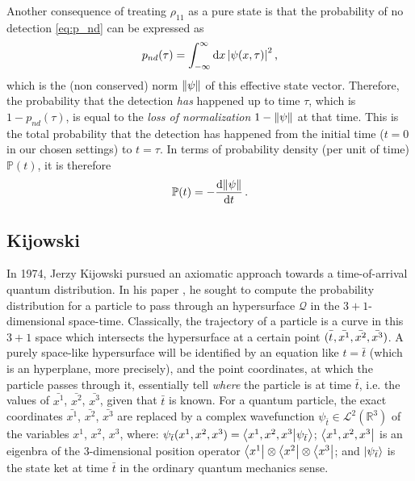 Another consequence of treating $\rho_{11}$ as a pure state is that the probability of no detection
\eqref{eq:p_nd} can be expressed as
\begin{equation}
  p_{nd}(\tau) = \int_{-\infty}^{\infty} \dd{x} \qty|\psi(x, \tau)|^2 \, \text{,}
\end{equation}
which is the (non conserved) norm $\norm{\psi}$ of this effective state vector.
Therefore, the probability that the detection \emph{has} happened
up to time $\tau$, which is $1 - p_{nd}(\tau)$, is equal to the
\emph{loss of normalization} $1 - \norm{\psi}$ at that time.
This is the total probability that the detection has happened from the initial time
($t=0$ in our chosen settings)
to $t = \tau$. In terms of probability density (per unit of time)
$\mathbb{P}(t)$, it is therefore
\begin{equation}
  \mathbb{P}(t) = - \dv{\norm{\psi}}{t} \,\text{.}
\end{equation}

\subsection{Kijowski}\label{sec:kijowski}

In 1974, Jerzy Kijowski pursued an axiomatic approach towards a
time-of-arrival quantum distribution. In his paper \parencite{Kijowski}, he sought to compute
the probability distribution for a particle to pass through an hypersurface
$\mathcal{Q}$ in the $3+1$-dimensional space-time.
Classically, the trajectory of a particle is a curve in this $3+1$ space
which intersects the hypersurface at a certain point $(\bar{t^{\vphantom{1em}}}, \bar{x^1}, \bar{x^2}, \bar{x^3})$.
A purely
space-like hypersurface will be identified by an equation like
$t=\bar{t}$ (which is an hyperplane, more precisely), and the point coordinates,
at which the particle passes through it, essentially tell \emph{where}
the particle is at time $\bar{t}$, i.e. the values of $\bar{x^1}$, $\bar{x^2}$, $\bar{x^3}$,
given that $\bar{t}$ is known.
For a quantum particle, the exact coordinates $\bar{x^1}$, $\bar{x^2}$, $\bar{x^3}$
are replaced by a complex wavefunction $\psi_{\bar{t}} \in \mathcal{L}^2(\mathbb{R}^3)$
of the variables $x^1$, $x^2$, $x^3$,
where:
$\psi_{\bar{t}}(x^1, x^2, x^3) = \braket{x^1, x^2, x^3}{\psi_{\bar{t}}}$;
$\bra{x^1, x^2, x^3}$ is an eigenbra of the 3-dimensional position operator $\bra{x^1} \otimes \bra{x^2} \otimes \bra{x^3}$;
and $\ket{\psi_{\bar{t}}}$ is the state ket at time $\bar{t}$ in the ordinary quantum mechanics sense.


